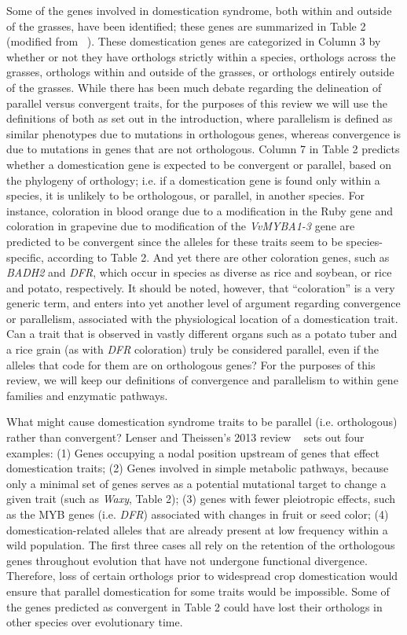 \documentclass[12pt]{article}
\begin{document}
Some of the genes involved in domestication syndrome, both within and outside of the grasses, have been identified; these genes are summarized in Table 2 (modified from ~\citep{Lenser2013}). These domestication genes are categorized in Column 3 by whether or not they have orthologs strictly within a species, orthologs across the grasses, orthologs within and outside of the grasses, or orthologs entirely outside of the grasses. While there has been much debate regarding the delineation of parallel versus convergent traits, for the purposes of this review we will use the definitions of both as set out in the introduction, where parallelism is defined as similar phenotypes due to mutations in orthologous genes, whereas convergence is due to mutations in genes that are not orthologous. Column 7 in Table 2 predicts whether a domestication gene is expected to be convergent or parallel, based on the phylogeny of orthology; i.e. if a domestication gene is found only within a species, it is unlikely to be orthologous, or parallel, in another species. For instance, coloration in blood orange due to a modification in the Ruby gene and coloration in grapevine due to modification of the \textit{VvMYBA1-3} gene are predicted to be convergent since the alleles for these traits seem to be species-specific, according to Table 2. And yet there are other coloration genes, such as \textit{BADH2} and \textit{DFR}, which occur in species as diverse as rice and soybean, or rice and potato, respectively.  It should be noted, however, that “coloration” is a very generic term, and enters into yet another level of argument regarding convergence or parallelism, associated with the physiological location of a domestication trait. Can a trait that is observed in vastly different organs such as a potato tuber and a rice grain (as with \textit{DFR} coloration) truly be considered parallel, even if the alleles that code for them are on orthologous genes? For the purposes of this review, we will keep our definitions of convergence and parallelism to within gene families and enzymatic pathways. 

What might cause domestication syndrome traits to be parallel (i.e. orthologous) rather than convergent? Lenser and Theissen’s 2013 review ~\citep{Lenser2013} sets out four examples: (1) Genes occupying a nodal position upstream of genes that effect domestication traits; (2) Genes involved in simple metabolic pathways, because only a minimal set of genes serves as a potential mutational target to change a given trait (such as \textit{Waxy}, Table 2); (3) genes with fewer pleiotropic effects, such as the MYB genes (i.e. \textit{DFR}) associated with changes in fruit or seed color; (4) domestication-related alleles that are already present at low frequency within a wild population.  The first three cases all rely on the retention of the orthologous genes throughout evolution that have not undergone functional divergence. Therefore, loss of certain orthologs prior to widespread crop domestication would ensure that parallel domestication for some traits would be impossible.  Some of the genes predicted as convergent in Table 2 could have lost their orthologs in other species over evolutionary time.
\end{document}
